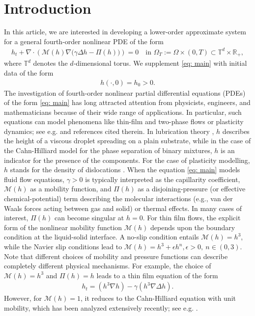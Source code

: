 \documentclass[11pt]{article}
\numberwithin{equation}{section}
\newtheorem{counter example}[theorem]{Counter Example}
\numberwithin{equation}{section}
\numberwithin{equation}{section}
\begin{document}
\section{Introduction}
In this article, we are interested in developing a lower-order approximate system for a general fourth-order nonlinear PDE of the form
\begin{align}\label{eq: main}
h_t + \nabla \cdot \left( \mathcal{M}(h)\nabla\big(\gamma \Delta h - \Pi(h)\big) \right) = 0
\quad \text{in } \Omega_T := \Omega \times (0,T) \subset \mathbb{T}^d\times\mathbb{R}_+ ,
\end{align}
where $\mathbb{T}^d$ denotes the $d$-dimensional torus. We supplement \eqref{eq: main} with initial data of the form
\begin{align}\label{initial_data_main}
    h(\cdot, 0)=h_0> 0.
\end{align}
The investigation of fourth-order nonlinear partial differential equations (PDEs) of the form \eqref{eq: main} has long attracted attention from physicists, engineers, and mathematicians because of their wide range of applications. In particular, such equations can model phenomena like thin-film and two-phase flows or plasticity dynamics; see e.g. \cite{elliott1996cahn, grun1995degenerate, beretta1995nonnegative} and references cited therein. In lubrication theory \cite{bertozzi1996lubrication, bertozzi1994lubrication}, $h$ describes the height of a viscous droplet spreading on a plain substrate, while in the case of the Cahn-Hilliard model for the phase separation of binary mixtures, $h$ is an indicator for the presence of the components. For the case of plasticity modelling, $h$ stands for the density of dislocations \cite{grun1995degenerate}. When the equation \eqref{eq: main} models fluid flow equations,  $\gamma>0$ is typically interpreted as the capillarity coefficient, $\mathcal{M}(h)$ as a mobility function, and $\Pi(h)$ as a disjoining-pressure (or effective chemical-potential) term describing the molecular interactions (e.g., van der
Waals forces acting between gas and solid) or thermal effects. In many cases of interest, $\Pi(h)$ can become singular at $h=0$. For thin film flows, the explicit form of the nonlinear mobility function $\mathcal{M}(h)$
depends upon the boundary condition at the liquid-solid interface. A no-slip condition
entails $\mathcal{M}(h)=h^3$, while the Navier slip conditions lead to $\mathcal{M}(h) = h^3 + \epsilon h^n, \epsilon >0, ~n\in (0, 3)$. Note that different choices of mobility and pressure functions can describe completely different physical mechanisms. For example, the choice of $\mathcal{M}(h)=h^3$ and $\Pi(h)=h$ leads to a thin film equation of the form
\begin{align}
    h_t=(h^3\nabla h)-\gamma(h^3\nabla \Delta h).
\end{align}
However, for $\mathcal{M}(h)=1$, it reduces to the Cahn-Hilliard equation with unit mobility, which has been analyzed extensively recently; see e.g. \cite{elliott1996cahn, dhaouadi2025first}.
\end{document}
